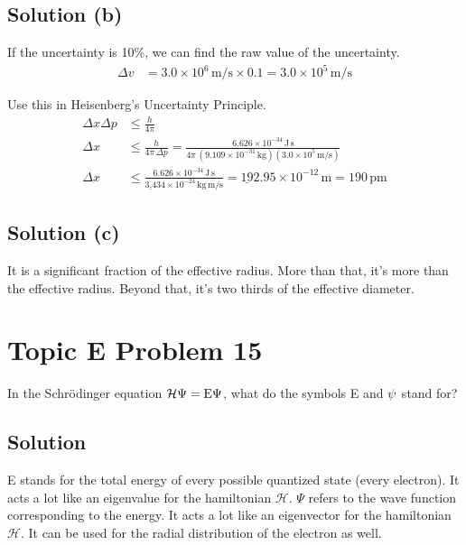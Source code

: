 \documentclass[10pt]{article}
\newcommand{\E}[1]{\times 10^{#1}}
\newcommand{\U}[1]{\underline{#1}}
\begin{document}
        \subsection{Solution (b)}
            If the uncertainty is 10\%, we can find the raw value of the uncertainty.
            \begin{align}
                \Delta v    &=  3.0\E{6}\,\unit{\meter/\second} \times 0.1
                    =   3.0\E{5}\,\unit{\meter/\second}
            \end{align}

            Use this in Heisenberg's Uncertainty Principle.
            \begin{align}
                \Delta x \Delta p   &\leq   \frac{h}{4\pi}\\
                \Delta x    &\leq   \frac{h}{4\pi\,\Delta p}
                    =   \frac{6.626\E{-34}\,\unit{\joule\,\second}}{4\pi\,(9.109\E{-31}\,\unit{\kilo\gram})(3.0\E{5}\,\unit{\meter/\second})}\\
                \Delta x    &\leq   \frac{6.626\E{-34}\,\unit{\joule\,\second}}{\U{3.4}34\E{-24}\,\unit{\kilo\gram\,\meter/\second}}
                    =   \U{19}2.95\E{-12}\,\unit{\meter}
                    =   \boxed{190\,\unit{\pico\meter}}
            \end{align}

        \subsection{Solution (c)}
            It is a significant fraction of the effective radius. More than that, it's more than the effective radius. 
            Beyond that, it's two thirds of the effective diameter.

    \pagebreak
    \section{Topic E Problem 15}
        In the Schrödinger equation $\rm \mathcal{H} \Psi = E \Psi$, what do the symbols E and $\rm \psi$ stand for?

        \subsection{Solution}
            E stands for the total energy of every possible quantized state (every electron).
            It acts a lot like an eigenvalue for the hamiltonian $\mathcal{H}$.
            $\Psi$ refers to the wave function corresponding to the energy. 
            It acts a lot like an eigenvector for the hamiltonian $\mathcal{H}$.
            It can be used for the radial distribution of the electron as well.
\end{document}
